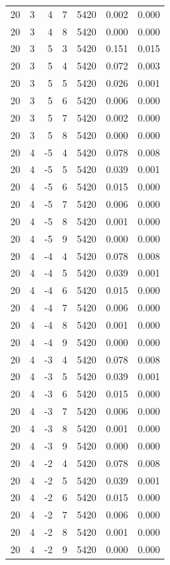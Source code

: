 \begin{table}
\begin{tabular}{rrrrrrr}
20 & 3 & 4 & 7 & 5420 & 0.002 & 0.000 \\
20 & 3 & 4 & 8 & 5420 & 0.000 & 0.000 \\
20 & 3 & 5 & 3 & 5420 & 0.151 & 0.015 \\
20 & 3 & 5 & 4 & 5420 & 0.072 & 0.003 \\
20 & 3 & 5 & 5 & 5420 & 0.026 & 0.001 \\
20 & 3 & 5 & 6 & 5420 & 0.006 & 0.000 \\
20 & 3 & 5 & 7 & 5420 & 0.002 & 0.000 \\
20 & 3 & 5 & 8 & 5420 & 0.000 & 0.000 \\
20 & 4 & -5 & 4 & 5420 & 0.078 & 0.008 \\
20 & 4 & -5 & 5 & 5420 & 0.039 & 0.001 \\
20 & 4 & -5 & 6 & 5420 & 0.015 & 0.000 \\
20 & 4 & -5 & 7 & 5420 & 0.006 & 0.000 \\
20 & 4 & -5 & 8 & 5420 & 0.001 & 0.000 \\
20 & 4 & -5 & 9 & 5420 & 0.000 & 0.000 \\
20 & 4 & -4 & 4 & 5420 & 0.078 & 0.008 \\
20 & 4 & -4 & 5 & 5420 & 0.039 & 0.001 \\
20 & 4 & -4 & 6 & 5420 & 0.015 & 0.000 \\
20 & 4 & -4 & 7 & 5420 & 0.006 & 0.000 \\
20 & 4 & -4 & 8 & 5420 & 0.001 & 0.000 \\
20 & 4 & -4 & 9 & 5420 & 0.000 & 0.000 \\
20 & 4 & -3 & 4 & 5420 & 0.078 & 0.008 \\
20 & 4 & -3 & 5 & 5420 & 0.039 & 0.001 \\
20 & 4 & -3 & 6 & 5420 & 0.015 & 0.000 \\
20 & 4 & -3 & 7 & 5420 & 0.006 & 0.000 \\
20 & 4 & -3 & 8 & 5420 & 0.001 & 0.000 \\
20 & 4 & -3 & 9 & 5420 & 0.000 & 0.000 \\
20 & 4 & -2 & 4 & 5420 & 0.078 & 0.008 \\
20 & 4 & -2 & 5 & 5420 & 0.039 & 0.001 \\
20 & 4 & -2 & 6 & 5420 & 0.015 & 0.000 \\
20 & 4 & -2 & 7 & 5420 & 0.006 & 0.000 \\
20 & 4 & -2 & 8 & 5420 & 0.001 & 0.000 \\
20 & 4 & -2 & 9 & 5420 & 0.000 & 0.000 \\

\end{tabular}
\end{table}
